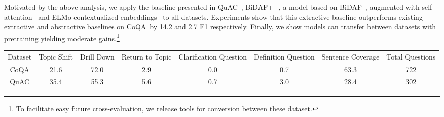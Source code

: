 \documentclass[11pt,a4paper]{article}
\newcommand{\quact}[0]{QuAC}
\newcommand{\coqa}[0]{CoQA}
\begin{document}
Motivated by the above analysis, we apply the baseline presented in \quact~\cite{ChoiQuAC2018}, BiDAF++, a model based on BiDAF~\cite{seo2016bidirectional}, augmented with self attention~\cite{clark2017simple} and ELMo contextualized embeddings~\cite{peters2018deep} to all datasets.
Experiments show that this extractive baseline outperforms existing extractive and abstractive baselines on \coqa~by 14.2 and 2.7 F1 respectively.
Finally, we show models can transfer between datasets with pretraining yielding moderate gains.\footnote{To facilitate easy future cross-evaluation, we release tools for conversion between these dataset.} 

\begin{table*}[t]
 \small
 \centering
\begin{tabular}
{c|c|c|c|c|c|c|c}

\multirow{2}{*}{Dataset}& \multirow{2}{*}{\parbox{1cm}{\centering Topic Shift}} &\multirow{2}{*}{\parbox{1cm}{\centering Drill Down}} & \multirow{2}{*}{\parbox{1.2cm}{\centering Return to Topic }} &
\multirow{2}{*}{\parbox{1.8 cm}{\centering Clarification Question}}  & \multirow{2}{*}{\parbox{1.7cm}{\centering Definition Question }} &
\multirow{2}{*}{\parbox{1.7cm}{\centering Sentence Coverage }} &
\multirow{2}{*}{\parbox{1.7cm}{\centering Total Questions }} 
\\
&&&&&\\\midrule
\coqa & 21.6 & 72.0  & 2.9 & 0.0 & 0.7  & 63.3 & 722 \\
\quact & 35.4 & 55.3 & 5.6 & 0.7 & 3.0  & 28.4 & 302  \\ 
 
\end{tabular}
\vspace{-5pt}
\caption{Comparison of dialog features in 50 random contexts from the development set of each dataset. \coqa~ contains questions that drill into details about topics and cover 60\% of sentences in the context while in \quact~ dialog switch topic more often and cover less than 30\% of sentences. Neither dataset has a significant number of returns to previous topics, clarifications, or definitional interactions. } 
\vspace{-5pt}
 \label{tab:dialog}
\end{table*}
\end{document}
